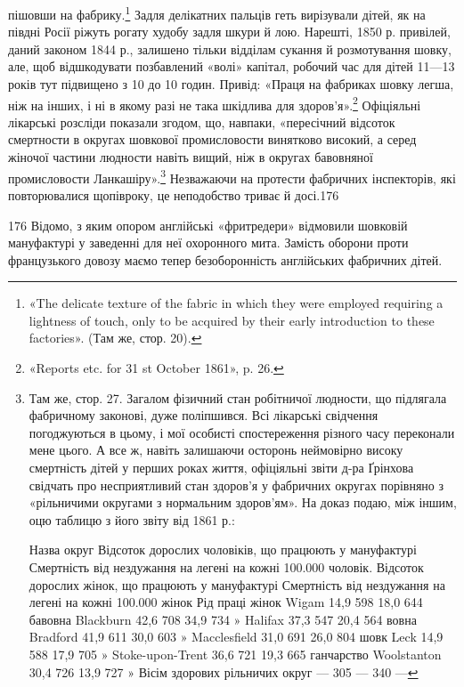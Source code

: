 пішовши на фабрику.\footnote{
«The delicate texture of the fabric in which they were employed
requiring a lightness of touch, only to be acquired by their early introduction
to these factories». (Там же, стор. 20).
} Задля делікатних пальців геть вирізували
дітей, як на півдні Росії ріжуть рогату худобу задля шкури
й лою. Нарешті, 1850 р. привілей, даний законом 1844 р., залишено
тільки відділам сукання й розмотування шовку, але, щоб
відшкодувати позбавлений «волі» капітал, робочий час для дітей
11—13 років тут підвищено з 10 до 10 годин. Привід: «Праця
на фабриках шовку легша, ніж на інших, і ні в якому разі не така
шкідлива для здоров’я».\footnote{
«Reports etc. for 31 st October 1861», p. 26.
} Офіціяльні лікарські розсліди показали
згодом, що, навпаки, «пересічний відсоток смертности в
округах шовкової промисловости винятково високий, а серед жіночої
частини людности навіть вищий, ніж в округах бавовняної
промисловости Ланкашіру».\footnote{
Там же, стор. 27. Загалом фізичний стан робітничої людности,
що підлягала фабричному законові, дуже поліпшився. Всі лікарські
свідчення погоджуються в цьому, і мої особисті спостереження різного
часу переконали мене цього. А все ж, навіть залишаючи осторонь неймовірно
високу смертність дітей у перших роках життя, офіціяльні
звіти д-ра Ґрінхова свідчать про несприятливий стан здоров’я у фабричних
округах порівняно з «рільничими округами з нормальним здоров'ям».
На доказ подаю, між іншим, оцю таблицю з його звіту від 1861 р.:

Назва округ    Відсоток дорослих чоловіків, що працюють у мануфактурі    Смертність від нездужання
на легені на кожні 100.000 чоловік. Відсоток дорослих жінок, що працюють у мануфактурі    Смертність
від нездужання на легені на кожні 100.000 жінок    Рід праці жінок
Wigam                        14,9     598    18,0     644    бавовна
Blackburn                   42,6     708    34,9     734          »
Halifax                        37,3      547    20,4     564     вовна
Bradford                      41,9     611   30,0    603         »
Macclesfield               31,0     691    26,0     804      шовк
Leck                             14,9     588    17,9     705           »
Stoke-upon-Trent     36,6    721    19,3     665    ганчарство
Woolstanton              30,4    726    13,9      727           »
Вісім здорових
рільничих округ       —       305   —        340            —
} Незважаючи на протести фабричних
інспекторів, які повторювалися щопівроку, це неподобство
триває й досі.176

176 Відомо, з яким опором англійські «фритредери» відмовили шовковій
мануфактурі у заведенні для неї охоронного мита. Замість оборони
проти французького довозу маємо тепер безоборонність англійських фабричних
дітей.
